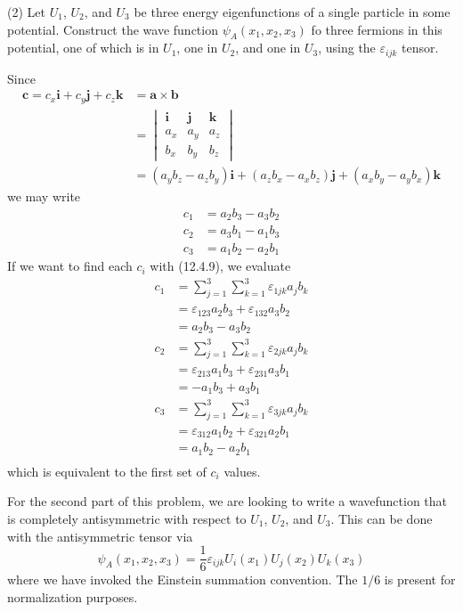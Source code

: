 \documentclass[../principles-of-quantum-mechanics.tex]{subfiles}
\begin{document}
\begin{questions}
	(2) Let $U_1$, $U_2$, and $U_3$ be three energy eigenfunctions of a single particle in some potential. Construct the wave function $\psi_A(x_1, x_2, x_3)$ fo three fermions in this potential, one of which is in $U_1$, one in $U_2$, and one in $U_3$, using the $\varepsilon_{ijk}$ tensor.
	\begin{solution}
		Since 
		\begin{align*} 
			\mathbf{c} = c_x\mathbf{i} + c_y\mathbf{j} + c_z\mathbf{k} &= \mathbf{a}\times\mathbf{b} \\
			&= \begin{vmatrix}\mathbf{i} & \mathbf{j} & \mathbf{k} \\ a_x & a_y & a_z \\ b_x & b_y & b_z\end{vmatrix} \\
			&= (a_yb_z - a_zb_y)\mathbf{i} + (a_zb_x - a_xb_z)\mathbf{j} + (a_xb_y - a_yb_x)\mathbf{k}
		\end{align*}
		we may write
		\begin{align*}
			c_1 &= a_2b_3 - a_3b_2 \\
			c_2 &= a_3b_1 - a_1b_3 \\
			c_3 &= a_1b_2 - a_2b_1
		\end{align*}
		If we want to find each $c_i$ with (12.4.9), we evaluate
		\begin{align*}
			c_1 &= \sum_{j=1}^3\sum_{k=1}^3\varepsilon_{1jk}a_jb_k \\
			&= \varepsilon_{123}a_2b_3 + \varepsilon_{132}a_3b_2 \\
			&= a_2b_3 - a_3b_2 \\
			c_2 &= \sum_{j=1}^3\sum_{k=1}^3\varepsilon_{2jk}a_jb_k \\
			&= \varepsilon_{213}a_1b_3 + \varepsilon_{231}a_3b_1 \\
			&= {-a_1b_3} + a_3b_1 \\
			c_3 &= \sum_{j=1}^3\sum_{k=1}^3\varepsilon_{3jk}a_jb_k \\
			&= \varepsilon_{312}a_1b_2 + \varepsilon_{321}a_2b_1 \\
			&= a_1b_2 - a_2b_1 \\
		\end{align*}
		which is equivalent to the first set of $c_i$ values.
		
		For the second part of this problem, we are looking to write a wavefunction that is completely antisymmetric with respect to $U_1$, $U_2$, and $U_3$. This can be done with the antisymmetric tensor via
		$$\psi_A(x_1, x_2, x_3) = \frac{1}{6}\varepsilon_{ijk}U_i(x_1)U_j(x_2)U_k(x_3)$$
		where we have invoked the Einstein summation convention. The $1/6$ is present for normalization purposes.
	\end{solution}


\end{questions}
\end{document}
